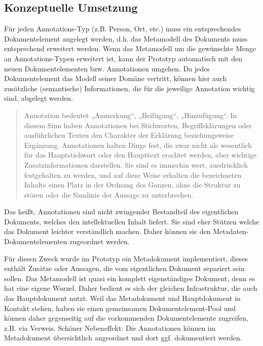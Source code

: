 
\subsection{Konzeptuelle Umsetzung}\label{}
 
Für jeden Annotations-Typ (z.B. Person, Ort, etc.) muss ein entsprechendes Dokumentelement angelegt werden, d.h. das Metamodell des Dokuments muss entsprechend erweitert werden. Wenn das Metamodell um die gewünschte Menge an Annotations-Typen erweitert ist, kann der Prototyp automatisch mit den neuen Dokumentelementen bzw. Annotationen umgehen. Da jedes Dokumentelement das Modell seiner Domäne vertritt, können hier auch zusätzliche (semantische) Informationen, die für die jeweilige Annotation wichtig sind, abgelegt werden.

 
\begin{quote}
 Annotation bedeutet „Anmerkung“, „Beifügung“, „Hinzufügung“. In diesem Sinn haben Annotationen bei Stichworten, Begriffsklärungen oder ausführlichen Texten den Charakter der Erklärung beziehungsweise Ergänzung. Annotationen halten Dinge fest, die zwar nicht als wesentlich für das Hauptstichwort oder den Haupttext erachtet werden, aber wichtige Zusatzinformationen darstellen. Sie sind es immerhin wert, ausdrücklich festgehalten zu werden, und auf diese Weise erhalten die bezeichneten Inhalte einen Platz in der Ordnung des Ganzen, ohne die Struktur zu stören oder die Sinnlinie der Aussage zu unterbrechen. \citep{WikiAnnotation}
\end{quote}
 
Das heißt, Annotationen sind nicht zwingender Bestandteil des eigentlichen Dokuments, welches den intellektuellen Inhalt liefert. Sie sind eher Stützen welche das Dokument leichter verständlich machen. Daher können sie den Metadaten-Dokumentelementen zugeordnet werden.

 
Für diesen Zweck wurde im Prototyp ein Metadokument implementiert, dieses enthält Zusätze oder Aussagen, die vom eigentlichen Dokument separiert sein sollen. Das Metamodell ist quasi ein komplett eigenständiges Dokument, denn es hat eine eigene Wurzel. Daher bedient es sich der gleichen Infrastruktur, die auch das Hauptdokument nutzt. Weil das Metadokument und Hauptdokument in Kontakt stehen, haben sie einen  gemeinsamen Dokumentelement-Pool und können daher gegenseitig auf die vorkommenden Dokumentelemente zugreifen, z.B. via Verweis. Schöner Nebeneffekt: Die Annotationen können im Metadokument übersichtlich angeordnet und dort ggf. dokumentiert werden.

